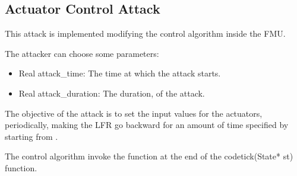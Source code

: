 \subsection{Actuator Control Attack}

This attack is implemented modifying the control algorithm inside the
 FMU\@.

The attacker can choose some parameters:
\begin{itemize}
\item Real attack\_time: The time at which the attack starts.
\item Real attack\_duration: The duration, of the attack.
\end{itemize}

The objective of the attack is to set the input values for the actuators,
periodically, making the LFR go backward for an amount of time specified by
 starting from .

The control algorithm invoke the  function at
the end of the code{tick(State* st)} function. 


